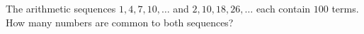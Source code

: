 The arithmetic sequences $1,4,7,10,\dots$ and $2,10,18,26,\dots$ each contain $100$ terms. How many numbers are common to both sequences?
